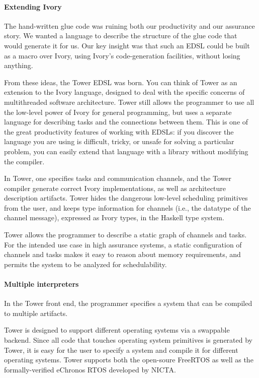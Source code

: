 \paragraph{Extending Ivory}
The hand-written glue code was ruining both our productivity and our assurance
story. We wanted a language to describe the structure of the glue code that
would generate it for us.
Our key insight was that such an EDSL could be built as a macro over Ivory,
using Ivory's code-generation facilities, without losing anything.

From these ideas, the Tower EDSL was born. You can think of Tower as an
extension to the Ivory language, designed to deal with the specific concerns of
multithreaded software architecture. Tower still allows the programmer to use
all the low-level power of Ivory for general programming, but uses a separate
language for describing tasks and the connections between them.  This is one of
the great productivity features of working with EDSLs: if you discover the
language you are using is difficult, tricky, or unsafe for solving a particular
problem, you can easily extend that language with a library without modifying
the compiler.

In Tower, one specifies tasks and communication channels, and the Tower compiler generate correct
Ivory implementations, as well as architecture description artifacts. Tower
hides the dangerous low-level scheduling primitives from the user, and keeps
type information for channels (i.e., the datatype of the channel message),
expressed as Ivory types, in the Haskell type system.

Tower allows the programmer to describe a static graph of channels and tasks.
For the intended use case in high assurance systems, a static configuration of
channels and tasks makes it easy to reason about memory requirements, and
permits the system to be analyzed for schedulability.

\paragraph{Multiple interpreters}

In the Tower front end, the programmer specifies a system that can be compiled
to multiple artifacts.

Tower is designed to support different operating systems via a swappable
backend. Since all code that touches operating system primitives is generated by
Tower, it is easy for the user to specify a system and compile it for
different operating systems. Tower supports both the open-soure
FreeRTOS\cite{freertos} as well as the formally-verified
eChronos RTOS\cite{echronos} developed by NICTA.

